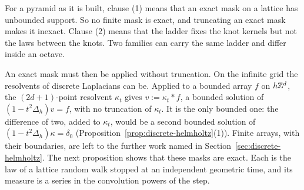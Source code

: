 For a pyramid as it is built, clause (1) means that an exact mask on a lattice has unbounded
support. So no finite mask is exact, and truncating an exact mask makes it inexact. Clause (2)
means that the ladder fixes the knot kernels but not the laws between the knots. Two families can
carry the same ladder and differ inside an octave.

An exact mask must then be applied without truncation. On the infinite grid the resolvents of
discrete Laplacians can be. Applied to a bounded array $f$ on $h\mathbb{Z}^d$, the $(2d+1)$-point
resolvent $\kappa_t$ gives $v := \kappa_t * f$, a bounded solution of $(1 - t^2\Delta_h)v = f$,
with no truncation of $\kappa_t$. It is the only bounded one: the difference of two, added to
$\kappa_t$, would be a second bounded solution of $(1 - t^2\Delta_h)\kappa = \delta_0$
(Proposition~\ref{prop:discrete-helmholtz}(1)). Finite arrays,
with their boundaries, are left to the further work named in Section~\ref{sec:discrete-helmholtz}.
The next proposition shows that these masks are exact. Each is the law of a lattice random walk stopped at an independent
geometric time, and its \Levy{} measure is a series in the convolution powers of the step.

